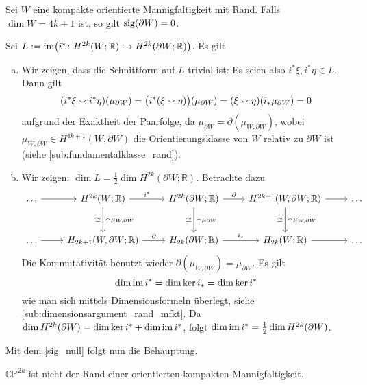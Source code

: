 \begin{satz}[{name=[{Rand einer 4k+1 Mannigfaltigkeit hat Signatur 0}]},label=satz:sig_rand_4k+1_mfkt]
	Sei $W$ eine kompakte orientierte Mannigfaltigkeit mit Rand.
	Falls $\dim W = 4k+1$ ist, so gilt $\sig(\partial W)=0$.
\end{satz}
\begin{beweis}
	Sei $L :=  \im \enbrace[\big]{i^* \colon H^{2k}(W;\mathbb{R}) \hookrightarrow H^{2k}(\partial W;\mathbb{R})}$. Es gilt
	\begin{enumerate}[a)]
		\item Wir zeigen, dass die Schnittform auf $L$ trivial ist:
		Es seien also $i^* \xi, i^* \eta \in L$.
		Dann gilt
		\[
			(i^* \xi \cupp i^* \eta) (\mu_{\partial W}) = \enbrace[\big]{i^*(\xi \cupp \eta)}(\mu_{\partial W})= (\xi \cupp \eta) \enbrace*{i_* \mu_{\partial W}} =0
		\]
		aufgrund der Exaktheit der Paarfolge, da $\mu_{\partial W}=\partial (\mu_{W,\partial W})$, wobei $\mu_{W,\partial W} \in H^{4k+1}(W,\partial W)$ die Orientierungsklasse von $W$ relativ zu $\partial W$ ist (siehe \cref{sub:fundamentalklasse_rand}).
		\item Wir zeigen: $\dim L = \frac{1}{2} \dim H^{2k}(\partial W;\mathbb{R})$.
		Betrachte dazu
		\[
			\begin{tikzcd}[row sep=large, column sep=2.4em]
				\ldots  \rar & H^{2k}(W;\mathbb{R}) \dar["\capp \mu_{W,\partial W}","\cong"'] \rar["i^*"] & H^{2k}(\partial W;\mathbb{R})  \dar["\capp \mu_{\partial W}","\cong"']\rar["\partial"] & H^{2k+1}(W,\partial W;\mathbb{R}) \rar \dar["\capp \mu_{W,\partial W}","\cong"']& \ldots \\
				\ldots \rar & H_{2k+1}(W,\partial W;\mathbb{R}) \rar["\partial"] & H_{2k}(\partial W;\mathbb{R}) \rar["i_*"] & H_{2k}(W;\mathbb{R}) \rar & \ldots 
			\end{tikzcd}
		\]
		Die Kommutativität benutzt wieder $\partial (\mu_{W,\partial W})=\mu_{\partial W}$.
		Es gilt
		\[
			\dim \im i^* = \dim \ker i_* = \dim \ker i^*
		\]
		wie man sich mittels Dimensionsformeln überlegt, siehe \cref{sub:dimensionsargument_rand_mfkt}.
		Da $\dim H^{2k}(\partial W) = \dim \ker i^* + \dim \im i^*$, folgt $\dim \im i^* = \frac{1}{2} \dim H^{2k}(\partial W)$.
	\end{enumerate}
	Mit dem \autoref{sig_null} folgt nun die Behauptung.
\end{beweis}

\begin{korollarB}[{name=[{Für gerade n ist der komplex projektive Raum nicht Rand einer Mannigfaltigkeit}]}]
	$\mathbb{CP}^{2k}$ ist nicht der Rand einer orientierten kompakten Mannigfaltigkeit.
\end{korollarB}

